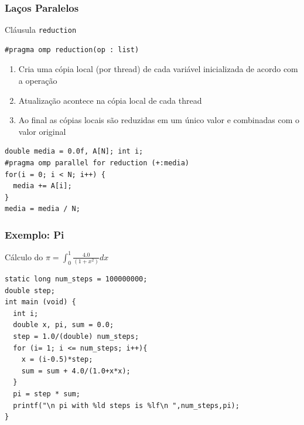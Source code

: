 \documentclass[xcolor={usenames,dvipsnames},12pt,presentation,aspectratio=169]{beamer}
\begin{document}
\begin{frame}[fragile]
  \frametitle{Laços Paralelos}
Cláusula \texttt{reduction}
\begin{minipage}{0.95\textwidth}  
\begin{verbatim}    
#pragma omp reduction(op : list)
\end{verbatim}
\end{minipage}
%
\pause
%
  \begin{enumerate}
  \item Cria uma cópia local (por thread) de cada variável inicializada de acordo com a operação
  \item Atualização acontece na cópia local de cada thread
  \item Ao final as cópias locais são reduzidas em um único valor e combinadas
    com o valor original
  \end{enumerate}
%
\pause
%
\begin{minipage}{0.95\textwidth}  
\begin{verbatim}  
double media = 0.0f, A[N]; int i;
#pragma omp parallel for reduction (+:media)
for(i = 0; i < N; i++) {
  media += A[i];
}
media = media / N;
\end{verbatim}
\end{minipage}
%
\end{frame}
\begin{frame}[fragile]
  \frametitle{Exemplo: Pi}
Cálculo do $\pi = \int_{0}^{1} \frac{4.0}{(1+x^2)} dx$
\begin{minipage}{0.95\textwidth}  
\begin{verbatim} 
static long num_steps = 100000000;
double step;
int main (void) {
  int i;
  double x, pi, sum = 0.0;
  step = 1.0/(double) num_steps;
  for (i= 1; i <= num_steps; i++){
    x = (i-0.5)*step;
    sum = sum + 4.0/(1.0+x*x);
  }
  pi = step * sum;
  printf("\n pi with %ld steps is %lf\n ",num_steps,pi);
}	  
\end{verbatim}
\end{minipage}
%
%
\end{frame}
\end{document}
